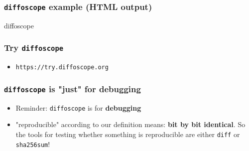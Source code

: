 \documentclass[14pt]{beamer}
\newif\ifplacelogo
\begin{document}
{\begin{frame}
 \frametitle{\texttt{diffoscope} example (HTML output)}
\end{frame}


\begin{frame}{diffoscope}
 \frametitle{Try \texttt{diffoscope}}
 \begin{itemize}
  \item \texttt{https://try.diffoscope.org}
 \end{itemize}
\end{frame}



\begin{frame}
 \frametitle{\texttt{diffoscope} is "just" for debugging}

 \begin{itemize}
  \item Reminder: \texttt{diffoscope} is for \textbf{debugging}
  \item<2> "reproducible" according to our definition means: \textbf{bit by bit
  identical}. So the tools for testing whether something is reproducible are
  either \texttt{diff} or \texttt{sha256sum}!
 \end{itemize}
\end{frame}

}

\placelogotrue
\end{document}
